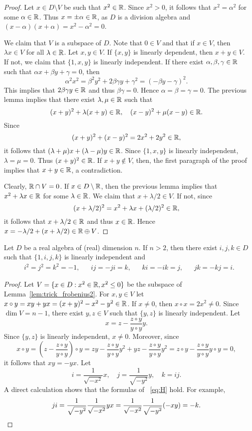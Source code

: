 \begin{proof}
	Let $x\in D\setminus V$ be such that $x^2\in\mathbb{R}$. Since $x^2>0$, it follows
	that $x^2=\alpha^2$ for some $\alpha\in\mathbb{R}$. Thus $x=\pm\alpha\in\mathbb{R}$, as $D$
	is a division algebra and $(x-\alpha)(x+\alpha)=x^2-\alpha^2=0$.

	We claim that $V$ is a subspace of $D$.  Note that $0\in V$ and 
	that if $x\in V$, then $\lambda x\in V$ for all $\lambda\in\mathbb{R}$.  Let 
	$x,y\in V$. If $\{x,y\}$ is linearly dependent, then $x+y\in V$.
	If not, we claim that 
	$\{1,x,y\}$ is linearly independent. If there exist 
	$\alpha,\beta,\gamma\in\mathbb{R}$ such that $\alpha x+\beta y+\gamma=0$, then 
	\[
	\alpha^2x^2=\beta^2y^2+2\beta\gamma y+\gamma^2=(-\beta y-\gamma)^2.
	\]
	This implies that $2\beta\gamma y\in\mathbb{R}$ and thus $\beta\gamma=0$. Hence 
	$\alpha=\beta=\gamma=0$. The previous lemma implies that there exist 
	$\lambda,\mu\in\mathbb{R}$ such that 
	\[
		(x+y)^2+\lambda(x+y)\in\mathbb{R},\quad
		(x-y)^2+\mu(x-y)\in\mathbb{R}.
	\]
	Since 
	\[
		(x+y)^2+(x-y)^2=2x^2+2y^2\in\mathbb{R},
	\]
	it follows that $(\lambda+\mu)x+(\lambda-\mu)y\in\mathbb{R}$. Since  $\{1,x,y\}$ is linearly 
	independent, 
	$\lambda=\mu=0$. Thus $(x+y)^2\in\mathbb{R}$. If 
	$x+y\not\in V$, then, the first paragraph of the proof implies that 
	$x+y\in\mathbb{R}$, a contradiction. 

	Clearly, $\mathbb{R}\cap V=0$. If $x\in D\setminus\mathbb{R}$, then the previous lemma 
	implies that $x^2+\lambda x\in\mathbb{R}$ for some 
	$\lambda\in\mathbb{R}$. We claim that $x+\lambda/2\in V$. If not, since 
	\[
	(x+\lambda/2)^2=x^2+\lambda x+(\lambda/2)^2\in\mathbb{R},
	\]
	it follows that $x+\lambda/2\in\mathbb{R}$ and thus $x\in\mathbb{R}$. Hence 
	$x=-\lambda/2+(x+\lambda/2)\in\mathbb{R}\oplus V$.
\end{proof}

\begin{lemma}
	\label{lem:trick_frobenius3}
	Let $D$ be a real algebra of (real) dimension $n$. If $n>2$, then
	there exist $i,j,k\in D$ such that $\{1,i,j,k\}$ is linearly independent and 
	\begin{align}
	\label{eq:H}
	&i^2=j^2=k^2=-1, && ij=-ji=k, && ki=-ik=j, && jk=-kj=i.
	\end{align}
\end{lemma}

\begin{proof}
	Let $V=\{x\in D:x^2\in\mathbb{R},x^2\leq 0\}$ be the subspace of Lemma~\ref{lem:trick_frobenius2}. 
	For $x,y\in V$ let $x\circ
	y=xy+yx=(x+y)^2-x^2-y^2\in\mathbb{R}$. If $x\ne0$, then $x\circ
	x=2x^2\ne0$. Since $\dim V=n-1$, there exist $y,z\in V$ such that $\{y,z\}$ is 
	linearly independent. Let 
	\[
		x=z-\frac{z\circ y}{y\circ y}y.
	\]
	Since $\{y,z\}$ is linearly independent, $x\ne0$. Moreover, since 
	\[
		x\circ y
		=\left(z-\frac{z\circ y}{y\circ y}\right)\circ y
		=zy-\frac{z\circ y}{y\circ y}y^2+yz-\frac{z\circ y}{y\circ y}y^2
		=z\circ y-\frac{z\circ y}{y\circ y}y\circ y=0,
	\]
	it follows that $xy=-yx$. 
	Let  
	\[
		i=\frac{1}{\sqrt{-x^2}}x,
		\quad
		j=\frac{1}{\sqrt{-y^2}}y,
		\quad
		k=ij. 
	\]
	A direct calculation shows that the formulas of ~\eqref{eq:H} hold. For example, 
	\[
		ji=\frac{1}{\sqrt{-y^2}}\frac{1}{\sqrt{-x^2}}yx=\frac{1}{\sqrt{-x^2}}\frac{1}{\sqrt{-y^2}}(-xy)=-k.\qedhere
	\]
\end{proof}

